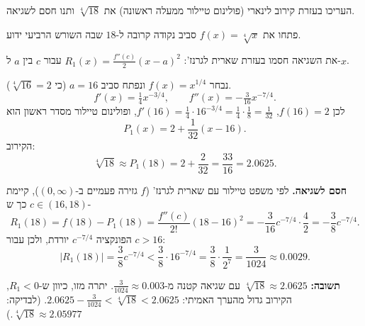 
\begin{question}
העריכו בעזרת קירוב לינארי (פולינום טיילור ממעלה ראשונה) את $\sqrt[4]{18}$ ותנו חסם לשגיאה.
\end{question}

\begin{hint}
פתחו את $f(x)=\sqrt[4]{x}$ סביב נקודה קרובה ל-$18$ שבה השורש הרביעי ידוע.
\end{hint}

\begin{hint}
את השגיאה חסמו בעזרת שארית לגרנז': $R_1(x)=\frac{f''(c)}{2}(x-a)^2$ עבור $c$ בין $a$ ל-$x$.
\end{hint}

\begin{solution}
נבחר $f(x)=x^{1/4}$ ונפתח סביב $a=16$ (כי $\sqrt[4]{16}=2$).
\[ f'(x)=\tfrac14x^{-3/4},\qquad f''(x)=-\tfrac{3}{16}x^{-7/4}. \]
לכן $f(16)=2$, $f'(16)=\frac14\cdot16^{-3/4}=\frac14\cdot\frac18=\frac1{32}$, ופולינום טיילור מסדר ראשון הוא
\[ P_1(x)=2+\frac{1}{32}(x-16). \]
הקירוב:
\[ \sqrt[4]{18}\approx P_1(18)=2+\frac{2}{32}=\frac{33}{16}=2.0625. \]

\textbf{חסם לשגיאה.} לפי משפט טיילור עם שארית לגרנז' ($f$ גזירה פעמיים ב-$(0,\infty)$), קיימת $c\in(16,18)$ כך ש-
\[ R_1(18)=f(18)-P_1(18)=\frac{f''(c)}{2!}(18-16)^2=-\frac{3}{16}c^{-7/4}\cdot\frac{4}{2}=-\frac{3}{8}c^{-7/4}. \]
הפונקציה $c^{-7/4}$ יורדת, ולכן עבור $c>16$:
\[ |R_1(18)|=\frac38c^{-7/4}<\frac38\cdot16^{-7/4}=\frac38\cdot\frac{1}{2^7}=\frac{3}{1024}\approx0.0029. \]

\textbf{תשובה:} $\sqrt[4]{18}\approx2.0625$ עם שגיאה קטנה מ-$\frac{3}{1024}\approx 0.003$. יתרה מזו, כיוון ש-$R_1<0$, הקירוב גדול מהערך האמיתי:
$2.0625-\frac{3}{1024}<\sqrt[4]{18}<2.0625$.
(לבדיקה: $\sqrt[4]{18}\approx2.05977$.)
\end{solution}
